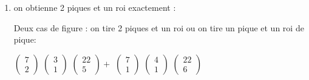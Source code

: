 \documentclass[a4paper,10pt]{article}
\begin{document}
\begin{enumerate}
\begin{enumerate}
		\item on obtienne 2 piques et un roi exactement :
		
		Deux cas de figure : on tire 2 piques et un roi ou on tire un pique et un roi de pique:
		
		$\left(\begin{array}{c} 7 \\ 2 \end{array} \right)$
		$\left(\begin{array}{c} 3 \\ 1 \end{array} \right)$
		$\left(\begin{array}{c} 22 \\ 5 \end{array} \right)+$
		$\left(\begin{array}{c} 7 \\ 1 \end{array} \right)$
		$\left(\begin{array}{c} 4 \\ 1 \end{array} \right)$
		$\left(\begin{array}{c} 22 \\ 6 \end{array} \right)$
		\end{enumerate}
	\end{enumerate}
	
\end{document}
